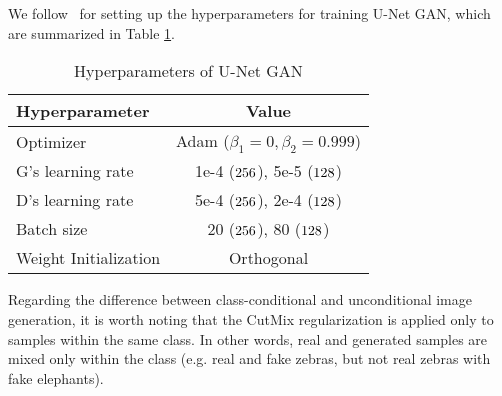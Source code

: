 \documentclass[10pt,twocolumn,letterpaper]{article}
\begin{document}
We follow~\cite{Brock2019} for setting up the hyperparameters for training U-Net GAN, which are summarized in Table \ref{table:hp}.
\begin{table}[H]
\begin{center}
\begin{tabular}{ |l|c| } 
 \hline
 Hyperparameter & Value \\ 
 \hline
 Optimizer & Adam ($\beta_1=0, \beta_2=0.999$)  \\ 
 G's learning rate  & 1e-4 ($256\time256$), 5e-5 ($128\time128$)  \\ 
 D's learning rate  & 5e-4 ($256\time256$), 2e-4 ($128\time128$) \\ 
 Batch size & 20 ($256\time256$), 80 ($128\time128$) \\ 
 Weight Initialization & Orthogonal \\
\hline
\end{tabular}
\end{center}
\caption{Hyperparameters of U-Net GAN}\label{table:hp}
\end{table}
 
Regarding the difference between class-conditional and unconditional image generation, it is worth noting that the CutMix regularization is applied only to samples within the same class. In other words, real and generated samples are mixed only within the class (e.g. real and fake zebras, but not real zebras with fake elephants).

 
\end{document}
